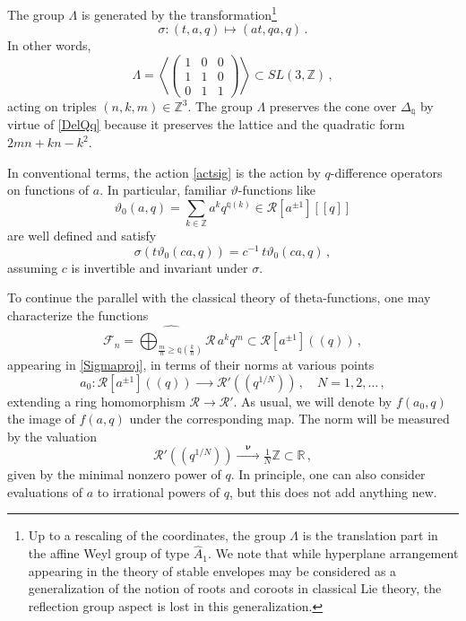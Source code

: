 \documentclass[14pt]{extarticle}
\newcommand{\Z}{\mathbb{Z}}
\newcommand{\R}{\mathbb{R}}
\newcommand{\cR}{\mathscr{R}}
\newcommand{\cF}{\mathscr{F}}
\newcommand{\vth}{\vartheta}
\newcommand{\Qq}{\mathbb{q}}
\newcommand{\bnu}{\boldsymbol \nu}
\newcommand{\Fq}{(\!(q)\!)}
\newcommand{\FqN}{(\!(q^{1/N})\!)}
\theoremstyle{definition}
\begin{document}
The group $\Lambda$ is generated by the
transformation\footnote{Up to a rescaling of the
coordinates, the group $\Lambda$ is the translation part in the affine
Weyl group of type $\widehat{A}_1$. We note that while hyperplane
arrangement appearing in the theory of stable envelopes may be
considered
as a generalization of the notion of roots and coroots in classical
Lie theory, the reflection group aspect is lost in this generalization.}
%
\begin{equation}
\sigma: (t,a,q)\mapsto (at,qa,q) \,. \label{actsig}
\end{equation}
%
In other words,
$$
\Lambda = \left\langle {\textstyle
    \begin{pmatrix}
      1 & 0 & 0\\
      1 & 1 & 0\\
      0 & 1 & 1
    \end{pmatrix}}
  \right\rangle
\subset SL(3,\Z)\,, 
$$
acting on triples $(n,k,m)\in \Z^3$. The group $\Lambda$ preserves the
cone over $\Delta_\Qq$ by virtue of \eqref{DelQq} because it preserves
the lattice and the quadratic form $2mn+kn-k^2$. 

In conventional terms, the action \eqref{actsig} is the action by
$q$-difference operators on functions of $a$. In particular, familiar
$\vth$-functions like
%
\begin{equation}
\vth_0(a,q) = \sum_{k\in \Z} a^k q^{\Qq(k)} \in \cR[a^{\pm
  1}][[q]]\label{theta_ser}
\end{equation}
%
are well defined and satisfy
%
\begin{equation}
\sigma( t \vth_0(c a,q)) =  c^{-1} \, t \vth_0(c a,q) \,,\label{thca}
\end{equation}
%
assuming $c$ is invertible and invariant under $\sigma$.

To continue the parallel with the classical theory of theta-functions,
one may characterize the functions
%
\begin{equation}
  \label{Fn}
  \cF_n= \widehat{\bigoplus_{\frac{m}{n} \ge
  \Qq\left(\frac{k}{n}\right)}}
\cR \, a^k q^m  \subset \cR[a^{\pm 1}]\Fq \,, 
\end{equation}
%
appearing in \eqref{Sigmaproj}, in terms of their norms at various
points
$$
a_0: \cR[a^{\pm 1}]\Fq \xrightarrow{\qquad}  \cR'\FqN \,, \quad N=1,2,\dots
\,,
$$
extending a ring homomorphism $\cR \to \cR'$. 
As usual, we will denote by $f(a_0,q)$ the image of $f(a,q)$ under the
corresponding map. The norm will be measured by the valuation 
%
\begin{equation}
\cR'\FqN \xrightarrow{\quad\bnu\quad} \tfrac 1N \Z \subset
\R\,,\label{val}
\end{equation}
%
given by the minimal nonzero power of $q$. In principle, one can also
consider evaluations of $a$ to irrational powers of $q$, but this does
not add
anything new.
\end{document}
